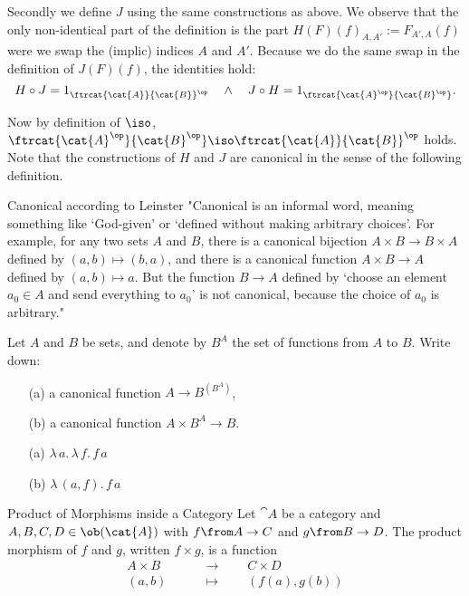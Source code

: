 \begin{answer}
  Secondly we define $J$ using the same constructions as above.
  We observe that the only non-identical part of the definition is the part $H(F)(f)_{A,A'} := F_{A',A}(f)$ were we swap the (implic) indices $A$ and $A'$.
  Because we do the same swap in the definition of $J(F)(f)$, the identities hold:
  $$H \circ J = 1_{\ftrcat{\cat{A}}{\cat{B}}^\op} \quad\land\quad  J \circ H = 1_{\ftrcat{\cat{A}^\op}{\cat{B}^\op}}.$$

  Now by definition of $\iso$,
  $\ftrcat{\cat{A}^\op}{\cat{B}^\op} \iso \ftrcat{\cat{A}}{\cat{B}}^\op$
  holds. Note that the constructions of $H$ and $J$ are canonical in the sense of the following definition.
\end{answer}

\begin{definition}{Canonical according to Leinster}
  "Canonical is an informal word, meaning something like `God-given' or
  `defined without making arbitrary choices'.  For example, for any two sets
  $A$ and $B$, there is a canonical bijection $A \times B \to B \times A$
  defined by $(a, b) \mapsto (b, a)$, and there is a canonical function $A
  \times B \to A$ defined by $(a, b) \mapsto a$.  But the function $B \to A$
  defined by `choose an element $a_0 \in A$ and send everything to $a_0$' is
  not canonical, because the choice of $a_0$ is arbitrary."
\end{definition}

\begin{exercise}
  Let $A$ and $B$ be sets, and denote by $B^A$ the set of functions from $A$
  to $B$.  Write down:
  \begin{itemize}
  \item[(a)] a canonical function $A \to B^{(B^A)}$,
  \item[(b)] a canonical function $A \times B^{A} \to B$.
  \end{itemize}
\end{exercise}
\begin{answer}
    \begin{itemize}
        \item[(a)] $\lambda\, a.\, \lambda\,f.\, f\,a$
        \item[(b)] $\lambda\, (a, f).\, f\,a$
    \end{itemize}
\end{answer}

\begin{definition}{Product of Morphisms inside a Category}
  Let $\cat{A}$ be a category and $A, B, C, D \in \ob(\cat{A})$ with $f \from A \to C$ and $g \from B \to D$.
  The product morphism of $f$ and $g$, written $f \times g$, is a function
  \begin{align*}
    A \times B &\qquad\to\qquad C \times D\\
    (a, b) &\qquad\mapsto\qquad (f(a), g(b))
  \end{align*}
\end{definition}

